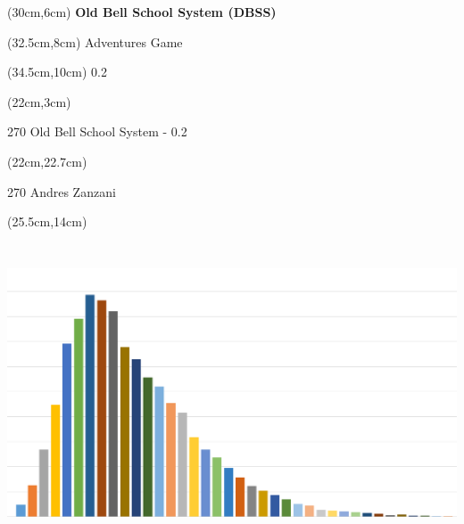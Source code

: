 \documentclass[10pt,a4paper]{article}
\def \versione {0.2}
\begin{document}
\pdfpagewidth=459.26mm
\thispagestyle{empty}

\begin{textblock*}{20cm}(30cm,6cm) %
\Huge \textbf{Old Bell School System (DBSS)}\\

\end{textblock*}

\begin{textblock*}{20cm}(32.5cm,8cm) %
\calligra\Huge{Adventures Game}\\

\end{textblock*}

\begin{textblock*}{20cm}(34.5cm,10cm) %
		{\LARGE \versione}
\end{textblock*}

\begin{textblock*}{20cm}(22cm,3cm) %
\begin{turn}{270} 
	{\Huge Old Bell School System - \versione}\\
\end{turn}
\end{textblock*}


\begin{textblock*}{20cm}(22cm,22.7cm) %
\begin{turn}{270} 
	{\Huge Andres Zanzani}
\end{turn}
\end{textblock*}



\begin{textblock*}{20cm}(25.5cm,14cm) %
	\includegraphics[bb=0 0 1148 636,width=6.85139in,height=3.79514in]{copertina.png}
\end{textblock*}
\end{document}
